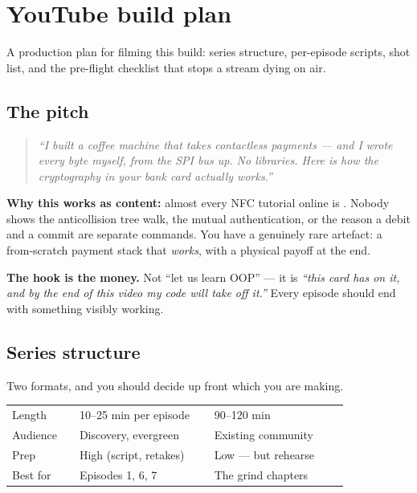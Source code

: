 \chapter{YouTube build plan}
\label{app:video}

A production plan for filming this build: series structure, per-episode scripts,
shot list, and the pre-flight checklist that stops a stream dying on air.

\section{The pitch}

\begin{quote}\itshape
``I built a coffee machine that takes contactless payments --- and I wrote every
byte myself, from the SPI bus up. No libraries. Here is how the cryptography in
your bank card actually works.''
\end{quote}

\textbf{Why this works as content:} almost every NFC tutorial online is
. Nobody shows the anticollision tree walk, the
mutual authentication, or the reason a debit and a commit are separate commands.
You have a genuinely rare artefact: a from-scratch payment stack that
\emph{works}, with a physical payoff at the end.

\textbf{The hook is the money.} Not ``let us learn OOP'' --- it is \emph{``this
card has  on it, and by the end of this video my code will take
 off it.''} Every episode should end with something visibly working.

\section{Series structure}

Two formats, and you should decide up front which you are making.

\begin{center}\small
\begin{tabular}{@{}L{0.18\linewidth}L{0.36\linewidth}L{0.36\linewidth}@{}}
\toprule
 &  &  \\
\midrule
Length   & 10--25 min per episode & 90--120 min \\
Audience & Discovery, evergreen   & Existing community \\
Prep     & High (script, retakes) & Low --- but rehearse \\
Best for & Episodes 1, 6, 7       & The grind chapters \\
\bottomrule
\end{tabular}
\end{center}

